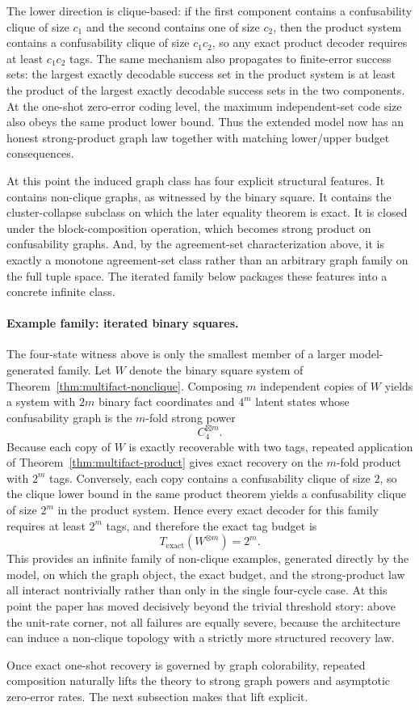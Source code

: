 The lower direction is clique-based: if the first component contains a confusability clique of size $c_1$ and the second contains one of size $c_2$, then the product system contains a confusability clique of size $c_1c_2$, so any exact product decoder requires at least $c_1c_2$ tags. The same mechanism also propagates to finite-error success sets: the largest exactly decodable success set in the product system is at least the product of the largest exactly decodable success sets in the two components. At the one-shot zero-error coding level, the maximum independent-set code size also obeys the same product lower bound. Thus the extended model now has an honest strong-product graph law together with matching lower/upper budget consequences.

At this point the induced graph class has four explicit structural features. It contains non-clique graphs, as witnessed by the binary square. It contains the cluster-collapse subclass on which the later equality theorem is exact. It is closed under the block-composition operation, which becomes strong product on confusability graphs. And, by the agreement-set characterization above, it is exactly a monotone agreement-set class rather than an arbitrary graph family on the full tuple space. The iterated family below packages these features into a concrete infinite class.

\paragraph{Example family: iterated binary squares.}
The four-state witness above is only the smallest member of a larger model-generated family. Let $W$ denote the binary square system of Theorem~\ref{thm:multifact-nonclique}. Composing $m$ independent copies of $W$ yields a system with $2m$ binary fact coordinates and $4^m$ latent states whose confusability graph is the $m$-fold strong power
\[
C_4^{\boxtimes m}.
\]
Because each copy of $W$ is exactly recoverable with two tags, repeated application of Theorem~\ref{thm:multifact-product} gives exact recovery on the $m$-fold product with $2^m$ tags. Conversely, each copy contains a confusability clique of size $2$, so the clique lower bound in the same product theorem yields a confusability clique of size $2^m$ in the product system. Hence every exact decoder for this family requires at least $2^m$ tags, and therefore the exact tag budget is
\[
T_{\mathrm{exact}}(W^{\otimes m}) = 2^m.
\]
This provides an infinite family of non-clique examples, generated directly by the model, on which the graph object, the exact budget, and the strong-product law all interact nontrivially rather than only in the single four-cycle case. At this point the paper has moved decisively beyond the trivial threshold story: above the unit-rate corner, not all failures are equally severe, because the architecture can induce a non-clique topology with a strictly more structured recovery law. 

Once exact one-shot recovery is governed by graph colorability, repeated composition naturally lifts the theory to strong graph powers and asymptotic zero-error rates. The next subsection makes that lift explicit.
